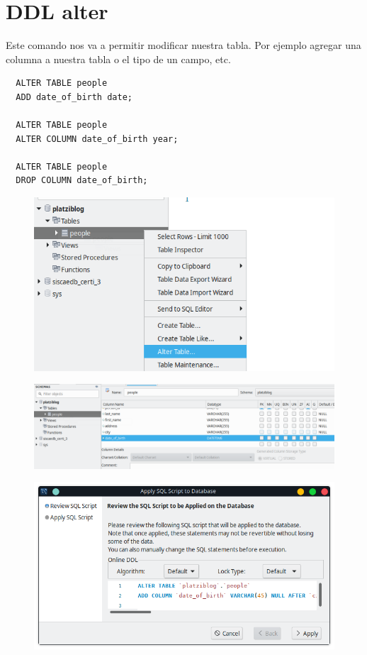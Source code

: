 \documentclass{article}
\begin{document}
\section{DDL alter}%
Este comando nos va a permitir modificar nuestra tabla. Por ejemplo agregar una
columna a nuestra tabla o el tipo de un campo, etc.

\begin{verbatim}
  ALTER TABLE people
  ADD date_of_birth date;

  ALTER TABLE people
  ALTER COLUMN date_of_birth year;

  ALTER TABLE people
  DROP COLUMN date_of_birth;
\end{verbatim}

\begin{figure}[h!]
  \centering
  \includegraphics[scale=0.55]{./Pictures/054_alter.png}
\end{figure}

\begin{figure}[h!]
  \centering
  \includegraphics[scale=0.55]{./Pictures/055_alter_table.png}
\end{figure}

\begin{figure}[h!]
  \centering
  \includegraphics[scale=0.55]{./Pictures/056_alter_confirm.png}
\end{figure}
\end{document}
